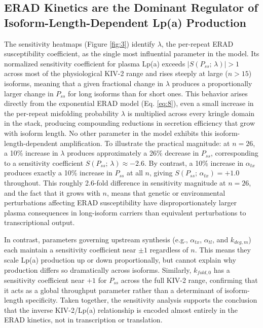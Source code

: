 \documentclass[12pt,letterpaper]{article}
\begin{document}
\subsection{ERAD Kinetics are the Dominant Regulator of Isoform-Length-Dependent 
Lp(a) Production}

The sensitivity heatmaps (Figure \ref{fig:3}) identify $\lambda$, the per-repeat ERAD susceptibility coefficient, as the single most influential parameter in the model. Its normalized sensitivity coefficient for plasma Lp(a) exceeds $|S(P_{ss};\, \lambda)| > 1$ across most of the physiological KIV-2 range and rises steeply at large ($n >15$) isoforms, meaning that a given fractional change in $\lambda$ produces a proportionally larger change in $P_{ss}$ for long isoforms than for short ones. This behavior arises directly from the exponential ERAD model (Eq. \ref{eq:8}), even a small increase in the per-repeat misfolding probability $\lambda$ is multiplied across every kringle domain in the stack, producing compounding reductions in secretion efficiency that grow with isoform length. No other parameter in the model exhibits this isoform-length-dependent amplification. To illustrate the practical magnitude: at $n = 26$, a 10\% increase in $\lambda$ produces approximately a 26\% decrease in $P_{ss}$, corresponding to a sensitivity coefficient $S(P_{ss};\, \lambda) \approx -2.6$. By contrast, a 10\% increase in $\alpha_{tx}$ produces exactly a 10\% increase in $P_{ss}$ at all $n$, giving $S(P_{ss};\, \alpha_{tx}) = +1.0$ throughout. This roughly 2.6-fold difference in sensitivity magnitude at $n = 26$, and the fact that it grows with $n$, means that genetic or environmental perturbations affecting ERAD susceptibility have disproportionately larger plasma consequences in long-isoform carriers than equivalent perturbations to transcriptional output.

In contrast, parameters governing upstream synthesis (e.g., $\alpha_{tx}$, $\alpha_{tl}$, and $k_{deg,m}$) each maintain a sensitivity coefficient near $\pm 1$ regardless of $n$. This means they scale Lp(a) production up or down proportionally, but cannot explain why production differs so dramatically across isoforms. Similarly, $k_{fold,0}$ has a sensitivity coefficient near $+1$ for $P_{ss}$ across the full KIV-2 range, confirming that it acts as a global throughput parameter rather than a determinant of isoform-length specificity. Taken together, the sensitivity analysis supports the conclusion that the inverse KIV-2/Lp(a) relationship is encoded almost entirely in the ERAD kinetics, not in transcription or translation.
\end{document}
